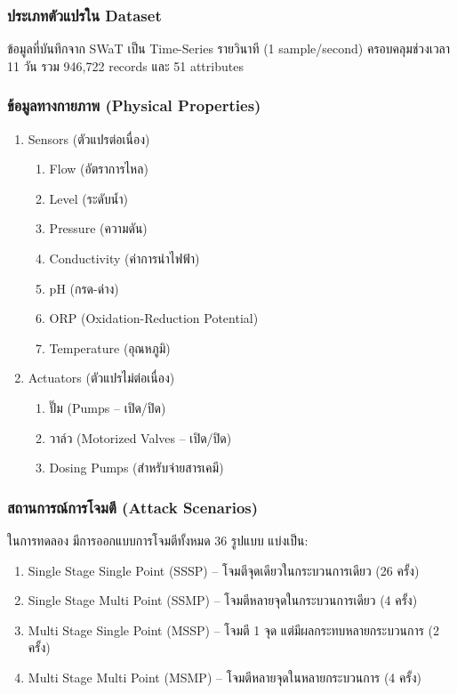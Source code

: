 \subsubsection{ประเภทตัวแปรใน Dataset}
\hspace{2em} ข้อมูลที่บันทึกจาก SWaT เป็น Time-Series รายวินาที (1 sample/second) ครอบคลุมช่วงเวลา 11 วัน รวม 946,722 records และ 51 attributes

\subsubsection{ข้อมูลทางกายภาพ (Physical Properties)}
\begin{enumerate}
  \item Sensors (ตัวแปรต่อเนื่อง)
  \begin{enumerate}
    \item Flow (อัตราการไหล)
    \item Level (ระดับน้ำ)
    \item Pressure (ความดัน)
    \item Conductivity (ค่าการนำไฟฟ้า)
    \item pH (กรด-ด่าง)
    \item ORP (Oxidation-Reduction Potential)
    \item Temperature (อุณหภูมิ)
  \end{enumerate}
  \item Actuators (ตัวแปรไม่ต่อเนื่อง)
  \begin{enumerate}
    \item ปั๊ม (Pumps – เปิด/ปิด)
    \item วาล์ว (Motorized Valves – เปิด/ปิด)
    \item Dosing Pumps (สำหรับจ่ายสารเคมี)
  \end{enumerate}
\end{enumerate}

\subsubsection{สถานการณ์การโจมตี (Attack Scenarios)}
\hspace{2em} ในการทดลอง มีการออกแบบการโจมตีทั้งหมด 36 รูปแบบ แบ่งเป็น:

\begin{enumerate}
  \item Single Stage Single Point (SSSP) – โจมตีจุดเดียวในกระบวนการเดียว (26 ครั้ง)
  \item Single Stage Multi Point (SSMP) – โจมตีหลายจุดในกระบวนการเดียว (4 ครั้ง)
  \item Multi Stage Single Point (MSSP) – โจมตี 1 จุด แต่มีผลกระทบหลายกระบวนการ (2 ครั้ง)
  \item Multi Stage Multi Point (MSMP) – โจมตีหลายจุดในหลายกระบวนการ (4 ครั้ง)
\end{enumerate}

